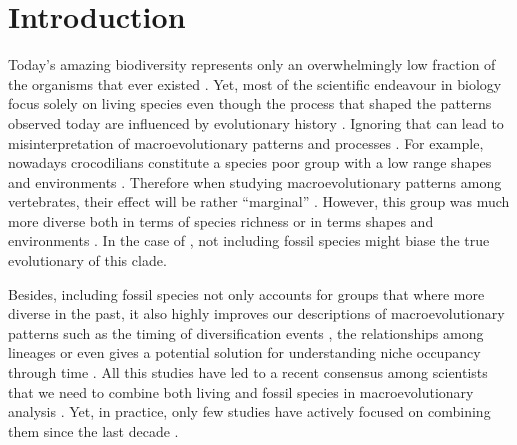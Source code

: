 \chapter{Introduction}
\label{chap:introduction}



%
% 


Today's amazing biodiversity represents only an overwhelmingly low fraction of the organisms that ever existed \citep{novacek1992ext,raup1993extinction}.
Yet, most of the scientific endeavour in biology focus solely on living species even though the process that shaped the patterns observed today are influenced by evolutionary history \citep{fritzdiversity2013}.
Ignoring that can lead to misinterpretation of macroevolutionary patterns and processes \citep{benton2015}.
For example, nowadays crocodilians constitute a species poor group \citep[25 species;][]{uetz2010original} with a low range shapes and environments \citep[marine or freshwater;][]{Martin2008}. %
Therefore when studying macroevolutionary patterns among vertebrates, their effect will be rather ``marginal'' \citep[e.g. on drivers of diversification;][]{Wiens2015}.
However, this group was much more diverse both in terms of species richness \citep[244 species recorded in][]{Bronzati2015} or in terms shapes and environments \citep{stubbs2013}.
In the case of \cite{Wiens2015}, not including fossil species might biase the true evolutionary of this clade. %

Besides, including fossil species not only accounts for groups that where more diverse in the past, it also highly improves our descriptions of macroevolutionary patterns such as the timing of diversification events \citep[e.g. significantly reducing node age confidence intervals;][]{ronquista2012}, the relationships among lineages \citep[e.g. solving some controversial fossil placement;][]{Dembo2015} or even gives a potential solution for understanding niche occupancy through time \citep[e.g.][]{pearmanniche2008}.
All this studies have led to a recent consensus among scientists that we need to combine both living and fossil species in macroevolutionary analysis \citep{jacksonwhat2006,quentaldiversity2010,dietlconservation2011,slaterunifying2013,fritzdiversity2013,benton2015}.
Yet, in practice, only few studies have actively focused on combining them since the last decade \citep[e.g.][]{ronquista2012,slaterphylogenetic2013,Wood01032013,beckancient2014,Arcila2015131,Dembo2015}. %

